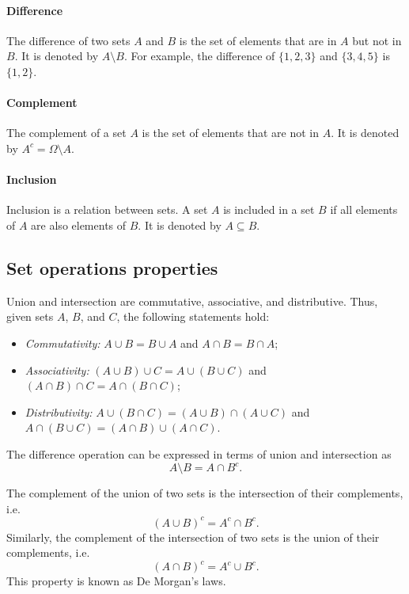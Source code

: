 \paragraph{Difference}  The difference of two sets $A$ and $B$ is the set of elements
that are in $A$ but not in $B$.  It is denoted by $A \setminus B$.  For example, the
difference of $\{1, 2, 3\}$ and $\{3, 4, 5\}$ is $\{1, 2\}$.

\paragraph{Complement}  The complement of a set $A$ is the set of elements that are not
in $A$.  It is denoted by $A^c = \Omega \setminus A$.

\paragraph{Inclusion}  Inclusion is a relation between sets.  A set $A$ is included in a
set $B$ if all elements of $A$ are also elements of $B$.  It is denoted by $A \subseteq B$.

\subsection{Set operations properties}

Union and intersection are commutative, associative, and distributive.  Thus, given sets
$A$, $B$, and $C$, the following statements hold:
\begin{itemize}
  \item \emph{Commutativity:} $A \cup B = B \cup A$ and $A \cap B = B \cap A$;
  \item \emph{Associativity:} $(A \cup B) \cup C = A \cup (B \cup C)$ and $(A \cap B) \cap C = A \cap (B \cap C)$;
  \item \emph{Distributivity:} $A \cup (B \cap C) = (A \cup B) \cap (A \cup C)$ and $A \cap (B \cup C) = (A \cap B) \cup (A \cap C)$.
\end{itemize}

The difference operation can be expressed in terms of union and intersection as
\[
  A \setminus B = A \cap B^c\text{.}
\]

The complement of the union of two sets is the intersection of their complements, i.e.
\[
  (A \cup B)^c = A^c \cap B^c\text{.}
\]
Similarly, the complement of the intersection of two sets is the union of their complements, i.e.
\[
  (A \cap B)^c = A^c \cup B^c\text{.}
\]
This property is known as De Morgan's laws.

